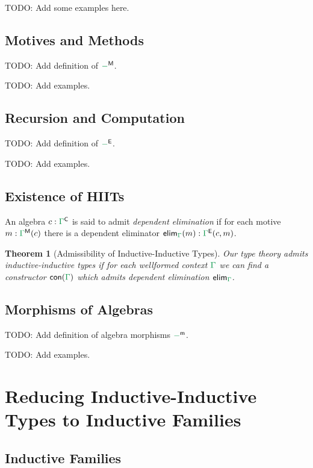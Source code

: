 \documentclass[12pt,headings=optiontohead,openany,oneside,a4paper]{book}
\newtheorem{thm}{Theorem}[section]
\theoremstyle{definition}
\newcommand{\gr}[1]{{\color{ForestGreen}#1}}
\newcommand{\grm}[1]{\ensuremath{\gr{#1}}}
\newcommand{\CC}{\mathsf{C}}
\newcommand{\EE}{\mathsf{E}}
\newcommand{\MM}{\mathsf{M}}
\newcommand{\mm}{\mathsf{m}}
\newcommand{\con}[1]{\mathsf{con}(\grm{#1})}
\newcommand{\elim}{\mathsf{elim}}
\begin{document}
TODO: Add some examples here.

\section{Motives and Methods}

TODO: Add definition of $\grm{-}^\MM$.

TODO: Add examples.

\section{Recursion and Computation}

TODO: Add definition of $\grm{-}^\EE$.

TODO: Add examples.

\section{Existence of HIITs}

\begin{defn}
An algebra $c : \grm{\Gamma}^\CC$ is said to admit \emph{dependent elimination}
if for each motive $m : \grm{\Gamma}^\MM(c)$ there is a dependent eliminator
$\elim_{\grm{\Gamma}}(m) : \grm{\Gamma}^\EE(c, m)$.
\end{defn}

\begin{thm}[Admissibility of Inductive-Inductive Types]
Our type theory admits inductive-inductive types if for each wellformed context
$\grm{\Gamma}$ we can find a constructor $\con{\grm{\Gamma}}$ which admits dependent
elimination $\elim_{\grm{\Gamma}}$.
\end{thm}

\section{Morphisms of Algebras}

TODO: Add definition of algebra morphisms $\grm{-}^\mm$.

TODO: Add examples.

\chapter{Reducing Inductive-Inductive Types to Inductive Families}

\section{Inductive Families}
\end{document}
